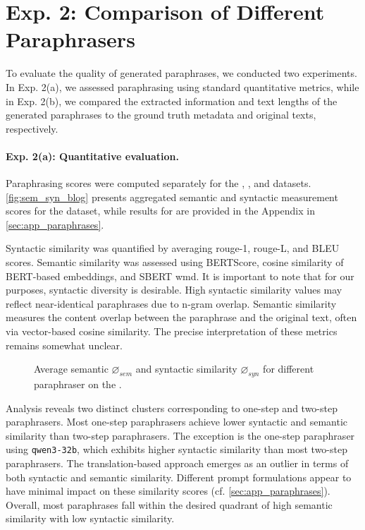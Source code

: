 \section{Exp. 2: Comparison of Different Paraphrasers}
\label{sec:comp_paraphrases}

To evaluate the quality of generated paraphrases, we conducted two experiments. 
In Exp. 2(a), we assessed paraphrasing using standard quantitative metrics, while in Exp. 2(b), we compared the extracted information and text lengths of the generated paraphrases to the ground truth metadata and original texts, respectively.

\paragraph{Exp. 2(a): Quantitative evaluation.}

Paraphrasing scores were computed separately for the \dataBlog{}, \dataGutenberg{}, and \dataStudent{} datasets. 
\autoref{fig:sem_syn_blog} presents aggregated semantic and syntactic measurement scores for the \dataBlog{} dataset, while results for \dataGutenberg{} are provided in the Appendix in \autoref{sec:app_paraphrases}.

Syntactic similarity was quantified by averaging \ac{rouge}-1, \ac{rouge}-L, and BLEU scores. 
Semantic similarity was assessed using BERTScore, cosine similarity of BERT-based embeddings, and SBERT \ac{wmd}. 
It is important to note that for our purposes, syntactic diversity is desirable.
High syntactic similarity values may reflect near-identical paraphrases due to n-gram overlap. 
Semantic similarity measures the content overlap between the paraphrase and the original text, often via vector-based cosine similarity. 
The precise interpretation of these metrics remains somewhat unclear.

\begin{figure}[htbp]
    \centering
    
    \caption[Comparison of paraphrasers on the \dataBlog{} dataset.]{Average semantic $\diameter_{sem}$ and syntactic similarity $\diameter_{syn}$ for different paraphraser on the \dataBlog{}.}
    \label{fig:sem_syn_blog}
\end{figure}


Analysis reveals two distinct clusters corresponding to one-step and two-step paraphrasers. 
Most one-step paraphrasers achieve lower syntactic and semantic similarity than two-step paraphrasers. 
The exception is the one-step paraphraser using \texttt{qwen3-32b}, which exhibits higher syntactic similarity than most two-step paraphrasers. 
The translation-based approach emerges as an outlier in terms of both syntactic and semantic similarity. 
Different prompt formulations appear to have minimal impact on these similarity scores (cf. \autoref{sec:app_paraphrases}). 
Overall, most paraphrases fall within the desired quadrant of high semantic similarity with low syntactic similarity.


